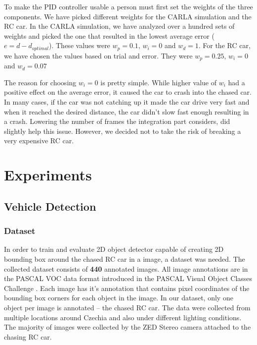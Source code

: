 To make the PID controller usable a person must first set the weights of the three components. We have picked different weights for the CARLA simulation and the RC car. In the CARLA simulation, we have analyzed over a hundred sets of weights and picked the one that resulted in the lowest average error ($e = d - d_{optimal}$). These values were $w_p=0.1$, $w_i=0$ and $w_d=1$. For the RC car, we have chosen the values based on trial and error. They were $w_p=0.25$, $w_i=0$ and $w_d=0.07$ \par

The reason for choosing $w_i=0$ is pretty simple. While higher value of $w_i$ had a positive effect on the average error, it caused the car to crash into the chased car. In many cases, if the car was not catching up it made the car drive very fast and when it reached the desired distance, the car didn't slow fast enough resulting in a crash. Lowering the number of frames the integration part considers, did slightly help this issue. However, we decided not to take the risk of breaking a very expensive RC car.



\chapter{Experiments}

\section{Vehicle Detection}
\subsection{Dataset}
In order to train and evaluate 2D object detector capable of creating 2D bounding box around the chased RC car in a image, a dataset was needed. The collected dataset consists of \textbf{440} annotated images. All image annotations are in the PASCAL VOC data format introduced in the PASCAL Visual Object Classes Challenge \cite{pascal-voc}. Each image has it's annotation that contains pixel coordinates of the bounding box corners for each object in the image. In our dataset, only one object per image is annotated -- the chased RC car. The data were collected from multiple locations around Czechia and also under different lighting conditions. The majority of images were collected by the ZED Stereo camera attached to the chasing RC car. 


